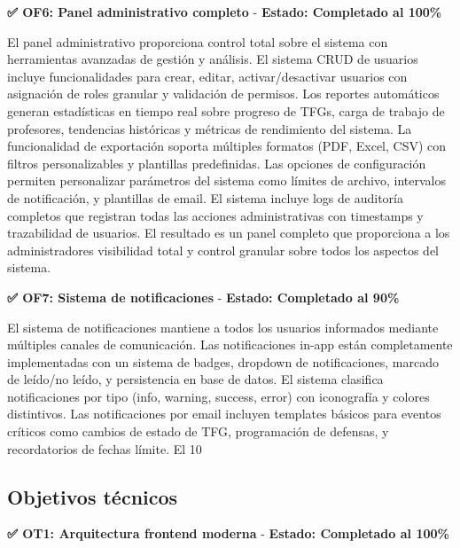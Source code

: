 \documentclass[12pt,a4paper,oneside]{report}
\begin{document}
\textbf{✅ OF6: Panel administrativo completo} - \textbf{Estado: Completado al 100\%}

El panel administrativo proporciona control total sobre el sistema con herramientas avanzadas de gestión y análisis. El sistema CRUD de usuarios incluye funcionalidades para crear, editar, activar/desactivar usuarios con asignación de roles granular y validación de permisos. Los reportes automáticos generan estadísticas en tiempo real sobre progreso de TFGs, carga de trabajo de profesores, tendencias históricas y métricas de rendimiento del sistema. La funcionalidad de exportación soporta múltiples formatos (PDF, Excel, CSV) con filtros personalizables y plantillas predefinidas. Las opciones de configuración permiten personalizar parámetros del sistema como límites de archivo, intervalos de notificación, y plantillas de email. El sistema incluye logs de auditoría completos que registran todas las acciones administrativas con timestamps y trazabilidad de usuarios. El resultado es un panel completo que proporciona a los administradores visibilidad total y control granular sobre todos los aspectos del sistema.

\textbf{✅ OF7: Sistema de notificaciones} - \textbf{Estado: Completado al 90\%}

El sistema de notificaciones mantiene a todos los usuarios informados mediante múltiples canales de comunicación. Las notificaciones in-app están completamente implementadas con un sistema de badges, dropdown de notificaciones, marcado de leído/no leído, y persistencia en base de datos. El sistema clasifica notificaciones por tipo (info, warning, success, error) con iconografía y colores distintivos. Las notificaciones por email incluyen templates básicos para eventos críticos como cambios de estado de TFG, programación de defensas, y recordatorios de fechas límite. El 10%

\subsection{Objetivos técnicos}\label{objetivos-tuxe9cnicos}

\textbf{✅ OT1: Arquitectura frontend moderna} - \textbf{Estado: Completado al 100\%}
\end{document}
